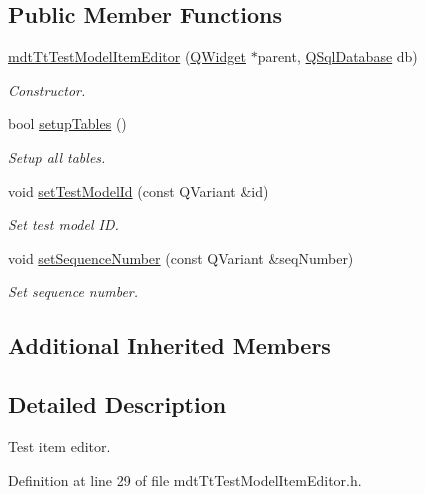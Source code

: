 \subsection*{Public Member Functions}
\begin{DoxyCompactItemize}
\item 
\hyperlink{classmdt_tt_test_model_item_editor_aad5b5dd51ec572e453a10bdaa22f91a8}{mdt\-Tt\-Test\-Model\-Item\-Editor} (\hyperlink{class_q_widget}{Q\-Widget} $\ast$parent, \hyperlink{class_q_sql_database}{Q\-Sql\-Database} db)
\begin{DoxyCompactList}\small\item\em Constructor. \end{DoxyCompactList}\item 
bool \hyperlink{classmdt_tt_test_model_item_editor_a1281b469c8d9493e2ce97923c7ce9b33}{setup\-Tables} ()
\begin{DoxyCompactList}\small\item\em Setup all tables. \end{DoxyCompactList}\item 
void \hyperlink{classmdt_tt_test_model_item_editor_a2e62312a7ae3887880d24bb819b33665}{set\-Test\-Model\-Id} (const Q\-Variant \&id)
\begin{DoxyCompactList}\small\item\em Set test model I\-D. \end{DoxyCompactList}\item 
void \hyperlink{classmdt_tt_test_model_item_editor_a93f43c103987bd26068566420ac4eaa2}{set\-Sequence\-Number} (const Q\-Variant \&seq\-Number)
\begin{DoxyCompactList}\small\item\em Set sequence number. \end{DoxyCompactList}\end{DoxyCompactItemize}
\subsection*{Additional Inherited Members}


\subsection{Detailed Description}
Test item editor. 

Definition at line 29 of file mdt\-Tt\-Test\-Model\-Item\-Editor.\-h.



